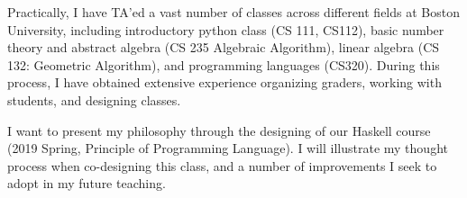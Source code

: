 \documentclass[11pt,a4paper,sans]{moderncv} %
\begin{document}
Practically, I have TA'ed a vast number of classes across different fields at Boston University, including introductory python class (CS 111, CS112), basic number theory and abstract algebra (CS 235 Algebraic Algorithm), linear algebra (CS 132: Geometric Algorithm), and programming languages (CS320).
During this process, I have obtained extensive experience organizing graders, working with students, and designing classes.

I want to present my philosophy through the designing of our Haskell course (2019 Spring, Principle of Programming Language). 
I will illustrate my thought process when co-designing this class, and a number of improvements I seek to adopt in my future teaching. 



\end{document}
